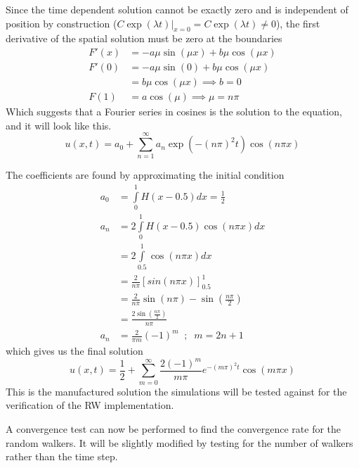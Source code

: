 Since the time dependent solution cannot be exactly zero and is independent of position by construction ($C\exp(\lambda t)|_{x=0} = C\exp(\lambda t) \neq 0$), the first derivative of the spatial solution must be zero at the boundaries
\begin{align*}
 F'(x) &= -a\mu\sin(\mu x) + b\mu\cos(\mu x) \\
 F'(0) &= -a \mu\sin(0) + b\mu\cos(\mu x) \\
 &= b\mu\cos(\mu x) \implies b=0 \\
 F(1) &= a\cos(\mu) \implies \mu = n\pi
\end{align*}
Which suggests that a Fourier series in cosines is the solution to the equation, and it will look like this.
\begin{equation}
 u(x,t) = a_0 + \sum\limits_{n=1}^\infty a_n\exp\left(-(n\pi)^2t\right)\cos(n\pi x)
\end{equation}

The coefficients are found by approximating the initial condition
\begin{align*}
 a_0 &= \int\limits_0^1H(x-0.5)dx = \frac{1}{2} \\
 a_n &= 2\int\limits_0^1H(x-0.5)\cos(n\pi x)dx \\
 &= 2\int\limits_{0.5}^1\cos(n\pi x)dx \\
 &= \frac{2}{n\pi}\left[sin(n\pi x)\right]_{0.5}^1 \\
 &= \frac{2}{n\pi}\sin(n\pi) - \sin(\frac{n\pi}{2}) \\
 &= \frac{2\sin(\frac{n\pi}{2})}{n\pi}\\
 a_n &= \frac{2}{\pi m} (-1)^m\;\;;\;\; m=2n+1
\end{align*}
which gives us the final solution
\begin{equation}
 u(x,t) = \frac{1}{2} + \sum\limits_{m=0}^\infty \frac{2(-1)^m}{m\pi}e^{-(m\pi)^2t}\cos(m\pi x)
\end{equation}
This is the manufactured solution the simulations will be tested against for the verification of the RW implementation.


A convergence test can now be performed to find the convergence rate for the random walkers.
It will be slightly modified by testing for the number of walkers rather than the time step. 


